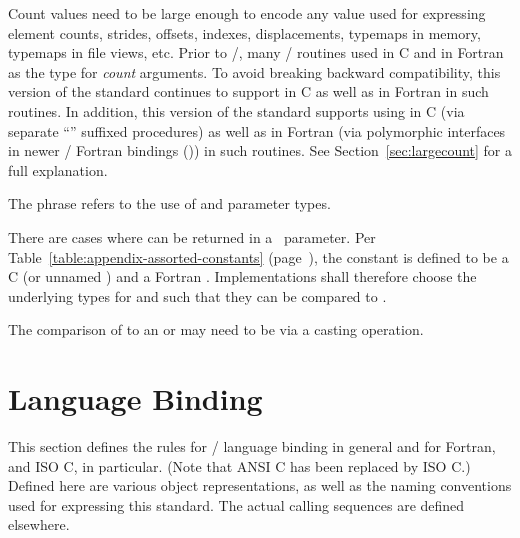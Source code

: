 \begin{rationale}
  Count values need to be large enough to encode any value used for expressing
  element counts, strides, offsets, indexes, displacements,
  typemaps in memory, typemaps in file views, etc.
  Prior to \MPIIVDOTO/, many \MPI/ routines used
   in C and  in Fortran
  as the type for \emph{count} arguments.
  To avoid breaking backward compatibility,
  this version of the standard continues to support
   in C as well as  in Fortran
  in such routines. In addition,
  this version of the standard supports using
   in C
  (via separate ``'' %
  suffixed procedures)
  as well as
   in Fortran
  (via polymorphic interfaces in newer \MPI/ Fortran bindings
  ())
  in such routines.
  See Section~\ref{sec:largecount} for a full explanation.
\end{rationale}

The phrase  refers
to the use of  and 
parameter types.

There are cases where  can be returned in a
 \OUT\ parameter.
%
Per Table~\ref{table:appendix-assorted-constants}
(page~\pageref{table:appendix-assorted-constants}), the
 constant is defined to be a C  (or
unnamed ) and a Fortran .
%
Implementations shall therefore choose the underlying types for
 and  such
that they can be compared to .

\begin{implementors}
  The comparison of  to an  or
   may need to be via a casting
  operation.
\end{implementors}

\section{Language Binding}
\label{subsec:lang}
\label{subsec:binding}

This section defines the rules for \MPI/ language binding in general and
for Fortran,
and ISO C, in particular.
(Note that ANSI C has been replaced by ISO C.)
Defined here are various object representations,
as well as the naming conventions used for expressing this
standard.
The actual calling sequences are defined elsewhere.

